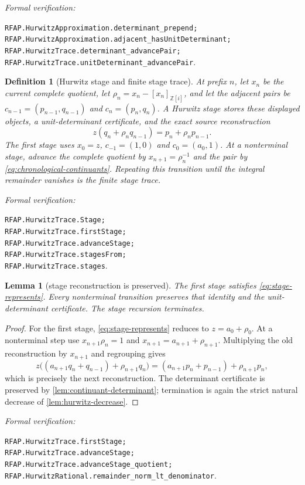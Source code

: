\documentclass[11pt]{article}
\newtheorem{lemma}[lemma]{Lemma}
\newtheorem{definition}[definition]{Definition}
\newcommand{\Zi}{\mathbb{Z}[i]}
\newcommand{\leanref}[1]{\par\smallskip\noindent
  \emph{Formal verification:}\par\nobreak
  {\raggedright\nolinkurl{#1}.\par}}
\begin{document}
\leanref{RFAP.HurwitzApproximation.determinant_prepend;
RFAP.HurwitzApproximation.adjacent_hasUnitDeterminant;
RFAP.HurwitzTrace.determinant_advancePair;
RFAP.HurwitzTrace.unitDeterminant_advancePair}

\begin{definition}[Hurwitz stage and finite stage trace]
\label{def:full-hurwitz-stage}
At prefix $n$, let $x_n$ be the current complete quotient, let
$\rho_n=x_n-[x_n]_{\Zi}$, and let the adjacent pairs be
$c_{n-1}=(p_{n-1},q_{n-1})$ and $c_n=(p_n,q_n)$.  A \emph{Hurwitz stage}
stores these displayed objects, a unit-determinant certificate, and the exact
source reconstruction
\begin{equation}
\label{eq:stage-represents}
 z(q_n+\rho_nq_{n-1})=p_n+\rho_np_{n-1}.
\end{equation}
The first stage uses $x_0=z$, $c_{-1}=(1,0)$ and
$c_0=(a_0,1)$.  At a nonterminal stage, advance the complete quotient by
$x_{n+1}=\rho_n^{-1}$ and the pair by
\eqref{eq:chronological-continuants}.  Repeating this transition until the
integral remainder vanishes is the finite stage trace.
\end{definition}

\leanref{RFAP.HurwitzTrace.Stage;
RFAP.HurwitzTrace.firstStage;
RFAP.HurwitzTrace.advanceStage;
RFAP.HurwitzTrace.stagesFrom;
RFAP.HurwitzTrace.stages}

\begin{lemma}[stage reconstruction is preserved]
\label{lem:stage-reconstruction}
The first stage satisfies \eqref{eq:stage-represents}.  Every nonterminal
transition preserves that identity and the unit-determinant certificate.
The stage recursion terminates.
\end{lemma}

\begin{proof}
For the first stage, \eqref{eq:stage-represents} reduces to
$z=a_0+\rho_0$.  At a nonterminal step use
$x_{n+1}\rho_n=1$ and
$x_{n+1}=a_{n+1}+\rho_{n+1}$.  Multiplying the old reconstruction by
$x_{n+1}$ and regrouping gives
\[
 z\bigl((a_{n+1}q_n+q_{n-1})+\rho_{n+1}q_n\bigr)
 = (a_{n+1}p_n+p_{n-1})+\rho_{n+1}p_n,
\]
which is precisely the next reconstruction.  The determinant certificate is
preserved by \cref{lem:continuant-determinant}; termination is again the
strict natural decrease of \cref{lem:hurwitz-decrease}.
\end{proof}

\leanref{RFAP.HurwitzTrace.firstStage;
RFAP.HurwitzTrace.advanceStage;
RFAP.HurwitzTrace.advanceStage_quotient;
RFAP.HurwitzRational.remainder_norm_lt_denominator}
\end{document}
